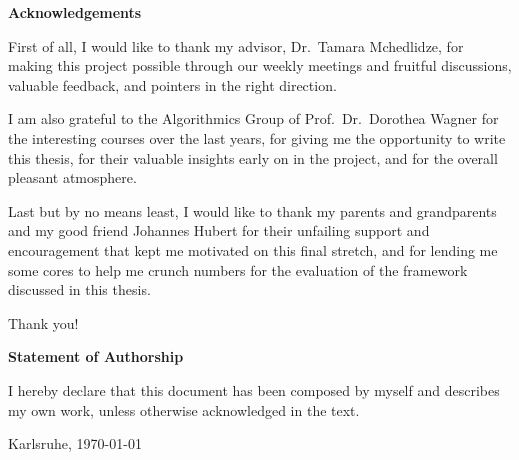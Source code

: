 \thispagestyle{plain}

\centerline{\textbf{Acknowledgements}}
\vspace{0.25cm}

First of all, I would like to thank my advisor, {Dr.~Tamara Mchedlidze}, for making this project possible through our weekly meetings and fruitful discussions, valuable feedback, and pointers in the right direction.

I am also grateful to the Algorithmics Group of {Prof.~Dr.~Dorothea Wagner} for the interesting courses over the last years, for giving me the opportunity to write this thesis, for their valuable insights early on in the project, and for the overall pleasant atmosphere.

Last but by no means least, I would like to thank my parents and grandparents and my good friend Johannes Hubert for their unfailing support and encouragement that kept me motivated on this final stretch, and for lending me some cores to help me crunch numbers for the evaluation of the framework discussed in this thesis.

Thank you!

\vspace*{\fill}



\centerline{\textbf{Statement of Authorship}}
\vspace{0.25cm}

I hereby declare that this document has been composed by myself and describes my own work, unless otherwise acknowledged in the text.

\vspace{2.5cm}

\noindent
\makebox[7.5cm]{\hrulefill}

\hspace{0.25cm}
Karlsruhe, \today

\vspace{2cm}
